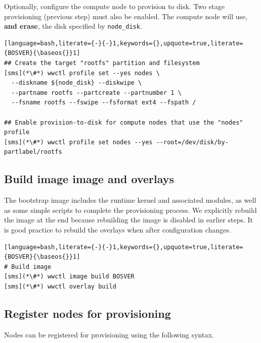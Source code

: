 Optionally, configure the compute node to provision to disk.  Two stage
provisioning (previous step) must also be enabled.  The compute node will use,
\textbf{and erase}, the disk specified by \texttt{node\_disk}.

\begin{lstlisting}[language=bash,literate={-}{-}1,keywords={},upquote=true,literate={BOSVER}{\baseos{}}1]
## Create the target "rootfs" partition and filesystem
[sms](*\#*) wwctl profile set --yes nodes \
  --diskname ${node_disk} --diskwipe \
  --partname rootfs --partcreate --partnumber 1 \
  --fsname rootfs --fswipe --fsformat ext4 --fspath /

## Enable provision-to-disk for compute nodes that use the "nodes" profile
[sms](*\#*) wwctl profile set nodes --yes --root=/dev/disk/by-partlabel/rootfs
\end{lstlisting}

\subsection{Build image image and overlays}

The bootstrap image includes the runtime kernel and associated modules, as well
as some simple scripts to complete the provisioning process.  We explicitly rebuild
the image at the end because rebuilding the image is disabled in earlier steps.
It is good practice to rebuild the overlays when after configuration changes.

\begin{lstlisting}[language=bash,literate={-}{-}1,keywords={},upquote=true,literate={BOSVER}{\baseos{}}1]
# Build image
[sms](*\#*) wwctl image build BOSVER
[sms](*\#*) wwctl overlay build
\end{lstlisting}

\subsection{Register nodes for provisioning}

Nodes can be registered for provisioning using the following syntax.

